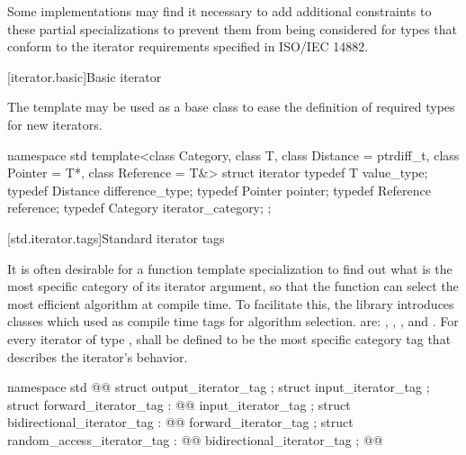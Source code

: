 {\color{newclr}
\pnum
\enternote Some implementations may find it necessary to add additional constraints to
these partial specializations to prevent them from being considered for types that
conform to the iterator requirements specified in ISO/IEC 14882.\exitnote
}

{\color{oldoldclr}
[iterator.basic]{Basic iterator}

\pnum
The
template may be used as a base class to ease the definition of required types
for new iterators.

\begin{codeblock}
namespace std {
  template<class Category, class T, class Distance = ptrdiff_t,
    class Pointer = T*, class Reference = T&>
  struct iterator {
    typedef T         value_type;
    typedef Distance  difference_type;
    typedef Pointer   pointer;
    typedef Reference reference;
    typedef Category  iterator_category;
  };
}
\end{codeblock}
} %

[std.iterator.tags]{Standard iterator tags}

\pnum
{}%
%
%
%
%
It is often desirable for a
function template specialization
to find out what is the most specific category of its iterator
argument, so that the function can select the most efficient algorithm at compile time.
To facilitate this, the
library introduces
classes which  used as compile time tags for algorithm selection.
 are:
,
,
,
and
.
For every iterator of type
,
shall be defined to be the most specific category tag that describes the
iterator's behavior.

\begin{codeblock}
namespace std { @@
  struct output_iterator_tag { };
  struct input_iterator_tag { };
  struct forward_iterator_tag : @@ input_iterator_tag { };
  struct bidirectional_iterator_tag : @@ forward_iterator_tag { };
  struct random_access_iterator_tag : @@ bidirectional_iterator_tag { };
}@\added{\}\}\newtxt{\}}}@
\end{codeblock}

